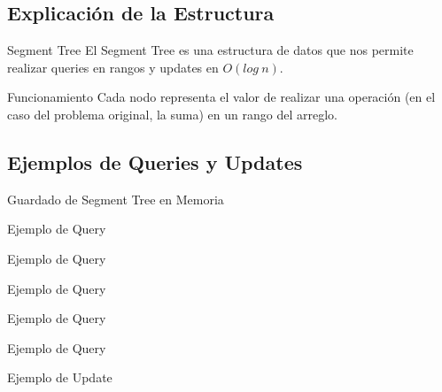 \documentclass{beamer}
\begin{document}
\subsection{Explicación de la Estructura}
\begin{frame}{Segment Tree}
El Segment Tree es una estructura de datos que nos permite realizar queries en rangos y updates en $O(log\:n)$.
\pause



\end{frame}

\begin{frame}{Funcionamiento}
Cada nodo representa el valor de realizar una operación (en el caso del problema original, la suma) en un rango del arreglo.


\end{frame}

\subsection{Ejemplos de Queries y Updates}

\begin{frame}{Guardado de Segment Tree en Memoria}

\end{frame}

\begin{frame}{Ejemplo de Query}

\end{frame}

\begin{frame}{Ejemplo de Query}

\end{frame}

\begin{frame}{Ejemplo de Query}

\end{frame}

\begin{frame}{Ejemplo de Query}

\end{frame}

\begin{frame}{Ejemplo de Query}

\end{frame}

\begin{frame}{Ejemplo de Update}

\end{frame}
\end{document}
